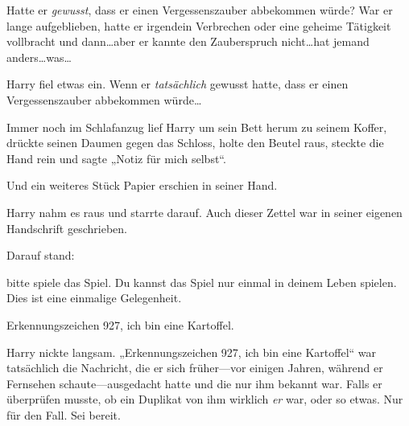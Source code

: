 Hatte er \emph{gewusst}, dass er einen Vergessenszauber abbekommen würde? War er lange aufgeblieben, hatte er irgendein Verbrechen oder eine geheime Tätigkeit vollbracht und dann…aber er kannte den Zauberspruch nicht…hat jemand anders…was…

Harry fiel etwas ein. Wenn er \emph{tatsächlich} gewusst hatte, dass er einen Vergessenszauber abbekommen würde…

Immer noch im Schlafanzug lief Harry um sein Bett herum zu seinem Koffer, drückte seinen Daumen gegen das Schloss, holte den Beutel raus, steckte die Hand rein und sagte „Notiz für mich selbst“.

Und ein weiteres Stück Papier erschien in seiner Hand.

Harry nahm es raus und starrte darauf. Auch dieser Zettel war in seiner eigenen Handschrift geschrieben.

Darauf stand:

\begin{writtenNote}

bitte spiele das Spiel. Du kannst das Spiel nur einmal in deinem Leben spielen. Dies ist eine einmalige Gelegenheit.

Erkennungszeichen 927, ich bin eine Kartoffel.

\end{writtenNote}

Harry nickte langsam. „Erkennungszeichen 927, ich bin eine Kartoffel“ war tatsächlich die Nachricht, die er sich früher—vor einigen Jahren, während er Fernsehen schaute—ausgedacht hatte und die nur ihm bekannt war. Falls er überprüfen musste, ob ein Duplikat von ihm wirklich \emph{er} war, oder so etwas. Nur für den Fall. Sei bereit.

